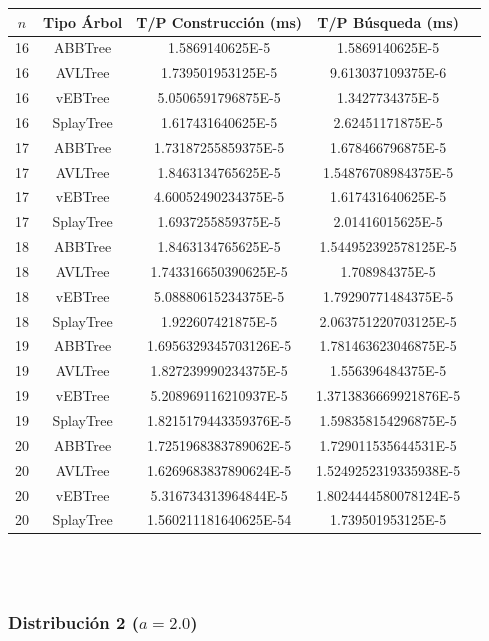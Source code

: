 \documentclass[letterpaper,12pt]{article}
\begin{document}
\begin{tabular}{|c|c|c|c|c|}
\hline
\textbf{$n$} & \textbf{Tipo Árbol} & \textbf{T/P Construcción (ms)} & \textbf{T/P Búsqueda (ms)} \\
\hline
16 & ABBTree & 1.5869140625E-5 & 1.5869140625E-5 \\
\hline
16 & AVLTree & 1.739501953125E-5  & 9.613037109375E-6 \\
\hline
16 & vEBTree & 5.0506591796875E-5  & 1.3427734375E-5 \\
\hline
16 & SplayTree & 1.617431640625E-5 & 2.62451171875E-5 \\
\hline
\hline
17 & ABBTree & 1.73187255859375E-5  & 1.678466796875E-5 \\
\hline
17 & AVLTree & 1.8463134765625E-5 & 1.54876708984375E-5 \\
\hline
17 & vEBTree & 4.60052490234375E-5  & 1.617431640625E-5\\
\hline
17 & SplayTree & 1.6937255859375E-5 & 2.01416015625E-5 \\
\hline
\hline
18 & ABBTree & 1.8463134765625E-5 & 1.544952392578125E-5 \\
\hline
18 & AVLTree & 1.743316650390625E-5 & 1.708984375E-5  \\
\hline
18 & vEBTree & 5.08880615234375E-5 & 1.79290771484375E-5 \\
\hline
18 & SplayTree & 1.922607421875E-5  & 2.063751220703125E-5 \\
\hline
\hline
19 & ABBTree & 1.6956329345703126E-5 & 1.781463623046875E-5 \\
\hline
19 & AVLTree & 1.827239990234375E-5  & 1.556396484375E-5 \\
\hline
19 & vEBTree & 5.208969116210937E-5 & 1.3713836669921876E-5\\
\hline
19 & SplayTree & 1.8215179443359376E-5  & 1.598358154296875E-5 \\
\hline
\hline
20 & ABBTree & 1.7251968383789062E-5 & 1.729011535644531E-5 \\
\hline
20 & AVLTree & 1.6269683837890624E-5 & 1.5249252319335938E-5 \\
\hline
20 & vEBTree & 5.316734313964844E-5  & 1.8024444580078124E-5\\
\hline
20 & SplayTree & 1.560211181640625E-54 & 1.739501953125E-5 \\
\hline
\end{tabular}
\\ \\

\subsubsection{Distribución 2 ($a=2.0$)}
\end{document}

